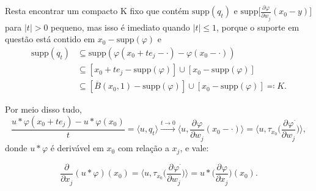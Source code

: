 \documentclass[../distribution_theory_notes.tex]{subfiles}
\begin{document}
\begin{proof*}
	Resta encontrar um compacto K fixo que contém \(\mathrm{supp}(q_{t})\) e \(\mathrm{supp}\biggl[\frac{\partial^{}\varphi }{\partial w_{j}^{}}(x_{0}-y)\biggr]\) para \(| t | > 0\) pequeno, mas isso é imediato quando \(| t |\leq 1\), porque o suporte em questão está contido em \(x_{0} - \mathrm{supp}(\varphi )\) e
	\begin{align*}
		\mathrm{supp}(q_{t}) & \subseteq \mathrm{supp}(\varphi (x_{0}+te_{j}-\cdot ) - \varphi(x_{0}-\cdot ))                               \\
		                     & \subseteq [x_{0}+te_{j}-\mathrm{supp}(\varphi )]\cup [x_{0} - \mathrm{supp}(\varphi )]                       \\
		                     & \subseteq [\overline{B}(x_{0}, 1) - \mathrm{supp}(\varphi )]\cup [x_{0}-\mathrm{supp}(\varphi )]\eqqcolon K.
	\end{align*}

	Por meio disso tudo,
	\[
		\frac{u*\varphi (x_{0}+te_{j}) - u*\varphi(x_{0})}{t} = \langle u, q_{t} \rangle\stackrel{t\to0}\rightarrow \biggl\langle u, \frac{\partial^{}\varphi }{\partial w_{j}^{}}(x_{0} - \cdot ) \biggr\rangle = \biggl\langle u, \tau_{x_{0}}\biggl(\frac{\partial^{}\varphi }{\partial w_{j}^{}}^{\check{}}\biggr) \biggr\rangle,
	\]
	donde \(u*\varphi \) é derivável em \(x_{0}\) com relação a \(x_{j}\), e vale:

	\[
		\frac{\partial^{}}{\partial x_{j}^{}}(u*\varphi )(x_{0}) = \biggl\langle u, \tau_{x_{0}}\biggl(\frac{\partial^{}\varphi }{\partial w_{j}^{}}^{\check{}}\biggr) \biggr\rangle = u * \biggl(\frac{\partial^{}\varphi }{\partial x_{j}^{}}\biggr)(x_{0}).
	\]


\end{proof*}
\end{document}
